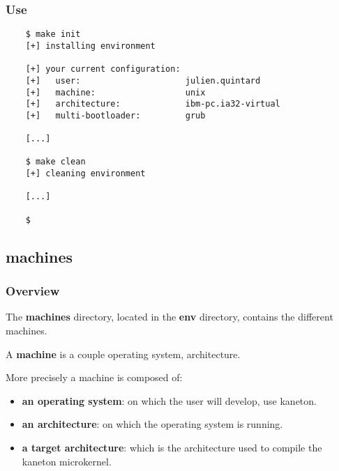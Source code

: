 
\begin{frame}[containsverbatim]
  \frametitle{Use}

  \begin{verbatim}
    $ make init
    [+] installing environment

    [+] your current configuration:
    [+]   user:                     julien.quintard
    [+]   machine:                  unix
    [+]   architecture:             ibm-pc.ia32-virtual
    [+]   multi-bootloader:         grub

    [...]

    $ make clean
    [+] cleaning environment

    [...]

    $
  \end{verbatim}
\end{frame}

%
%

\subsection{machines}


\begin{frame}
  \frametitle{Overview}

  The \textbf{machines} directory, located in the \textbf{env} directory,
  contains the different machines.

  \nl

  A \textbf{machine} is a couple operating system, architecture.

  \nl

  More precisely a machine is composed of:

  \begin{itemize}[<+->]
    \item
      \textbf{an operating system}: on which the user will develop,
      use kaneton.
    \item
      \textbf{an architecture}: on which the operating system
      is running.
    \item
      \textbf{a target architecture}: which is the architecture used
      to compile the kaneton microkernel.
  \end{itemize}
\end{frame}



